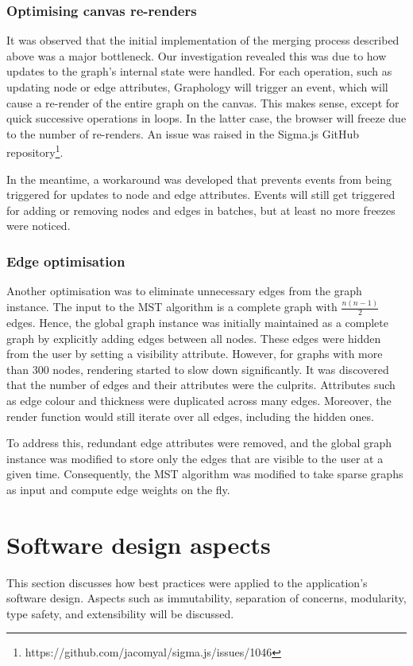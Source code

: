 \documentclass{l4proj}
\begin{document}
\subsubsection{Optimising canvas re-renders}
It was observed that the initial implementation of the merging process described above was a major bottleneck. Our investigation revealed this was due to how updates to the graph's internal state were handled.
For each operation, such as updating node or edge attributes, Graphology will trigger an event, which will cause a re-render of the entire graph on the canvas. This makes sense, except for quick successive operations in loops. In the latter case, the browser will freeze due to the number of re-renders. An issue was raised in the Sigma.js GitHub repository\footnote{https://github.com/jacomyal/sigma.js/issues/1046}.

In the meantime, a workaround was developed that prevents events from being triggered for updates to node and edge attributes. Events will still get triggered for adding or removing nodes and edges in batches, but at least no more freezes were noticed.

\subsubsection{Edge optimisation}
Another optimisation was to eliminate unnecessary edges from the graph instance. The input to the MST algorithm is a complete graph with $\frac{n(n-1)}{2}$ edges.
Hence, the global graph instance was initially maintained as a complete graph by explicitly adding edges between all nodes. These edges were hidden from the user by setting a visibility attribute.
However, for graphs with more than 300 nodes, rendering started to slow down significantly. It was discovered that the number of edges and their attributes were the culprits. Attributes such as edge colour and thickness were duplicated across many edges. Moreover, the render function would still iterate over all edges, including the hidden ones.

To address this, redundant edge attributes were removed, and the global graph instance was modified to store only the edges that are visible to the user at a given time.
Consequently, the MST algorithm was modified to take sparse graphs as input and compute edge weights on the fly.

\section{Software design aspects}
This section discusses how best practices were applied to the application's software design. Aspects such as immutability, separation of concerns, modularity, type safety, and extensibility will be discussed.
\end{document}
